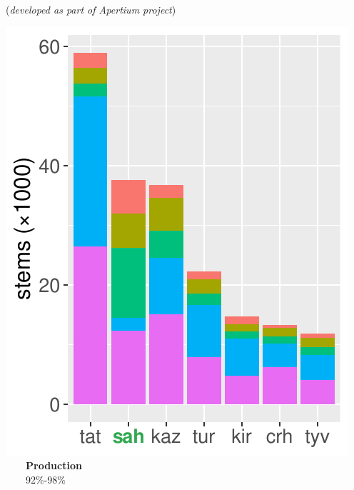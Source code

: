 \documentclass[a0paper,fleqn]{betterposter}
\begin{document}
{\vspace{-2em}

\begin{center}
	({\em developed as part of Apertium project})
\end{center}


\begin{minipage}{0.317\textwidth}
    \centering
    \includegraphics[width=\textwidth]{img/lgs1}\vspace{-0.8em}\\
    {\color{lightgreen}~~~~\textbf{Production}}\\
    ~~~~92\%-98\%
\end{minipage}
\begin{minipage}{0.356\textwidth}
    \centering

\end{minipage}}
\end{document}
